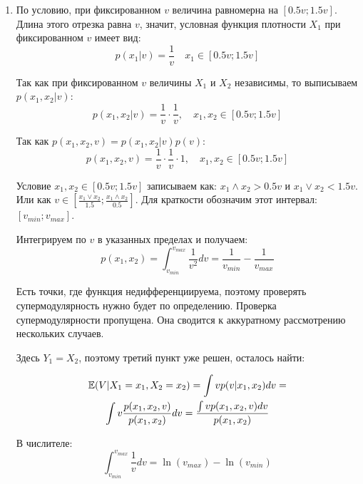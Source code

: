 \begin{enumerate}


\item  По условию, при фиксированном $ v $ величина равномерна на $ [0.5v;1.5v] $. Длина этого отрезка равна $ v $, значит, условная функция плотности $ X_{1} $ при фиксированном $ v $ имеет вид:
\begin{equation}
p(x_{1}|v)=\frac{1}{v}\quad x_{1}\in [0.5v;1.5v]
\end{equation}


Так как при фиксированном $ v $ величины $X_{1}  $ и $ X_{2} $ независимы, то выписываем $ p(x_{1},x_{2}|v) $:
\begin{equation}
p(x_{1},x_{2}|v)=\frac{1}{v}\cdot \frac{1}{v}, \quad x_{1},x_{2}\in [0.5v;1.5v]
\end{equation}

Так как $ p(x_{1},x_{2},v)=p(x_{1},x_{2}|v)p(v) $:
\begin{equation}
p(x_{1},x_{2},v)=\frac{1}{v}\cdot \frac{1}{v}\cdot 1, \quad x_{1},x_{2}\in [0.5v;1.5v]
\end{equation}

Условие $ x_{1},x_{2}\in [0.5v;1.5v] $ записываем как: $ x_{1}\wedge x_{2} > 0.5v $ и $ x_{1}\vee x_{2} <1.5v $. Или как $ v\in [\frac{x_{1}\vee x_{2}}{1.5};\frac{x_{1}\wedge x_{2}}{0.5}] $. Для краткости обозначим этот интервал: $ [v_{min};v_{max}] $.

Интегрируем по $ v $ в указанных пределах и получаем:
\begin{equation}
p(x_{1},x_{2})=\int_{v_{min}}^{v_{max}}\frac{1}{v^{2}}dv=\frac{1}{v_{min}}-\frac{1}{v_{max}}
\end{equation}

Есть точки, где функция недифференциируема, поэтому проверять супермодулярность нужно будет по определению. Проверка супермодулярности пропущена. Она сводится к аккуратному рассмотрению нескольких случаев.

Здесь $ Y_{1}=X_{2} $, поэтому третий пункт уже решен, осталось найти:

\begin{multline}
\mathbb{E}(V|X_{1}=x_{1}, X_{2}=x_{2})=\int v p(v|x_{1},x_{2})dv=\\
\int v \frac{p(x_{1},x_{2},v)}{p(x_{1},x_{2})} dv=\frac{\int v p(x_{1},x_{2},v) dv }{p(x_{1},x_{2})}
\end{multline}

В числителе:
\begin{equation}
\int_{v_{min}}^{v_{max}}\frac{1}{v}dv=\ln(v_{max})-\ln(v_{min})
\end{equation}


\end{enumerate}
